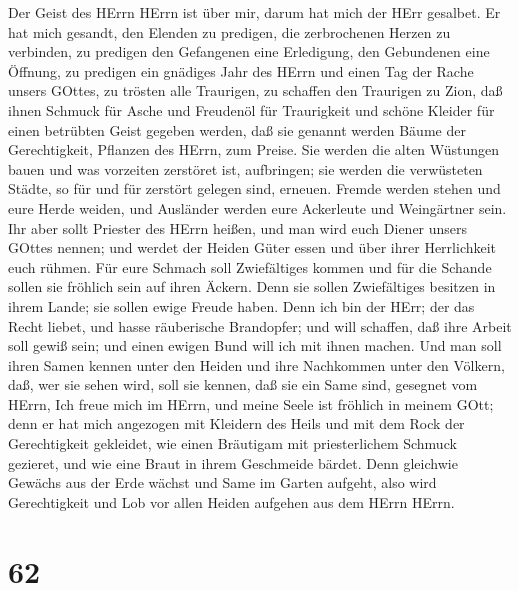  Der Geist des HErrn HErrn ist über mir, darum hat mich der
HErr gesalbet. Er hat mich gesandt, den Elenden zu predigen, die
zerbrochenen Herzen zu verbinden, zu predigen den Gefangenen eine
Erledigung, den Gebundenen eine Öffnung,  zu predigen ein
gnädiges Jahr des HErrn und einen Tag der Rache unsers GOttes, zu
trösten alle Traurigen,  zu schaffen den Traurigen zu Zion,
daß ihnen Schmuck für Asche und Freudenöl für Traurigkeit und schöne
Kleider für einen betrübten Geist gegeben werden, daß sie genannt werden
Bäume der Gerechtigkeit, Pflanzen des HErrn, zum Preise. 
Sie werden die alten Wüstungen bauen und was vorzeiten zerstöret ist,
aufbringen; sie werden die verwüsteten Städte, so für und für zerstört
gelegen sind, erneuen.  Fremde werden stehen und eure Herde
weiden, und Ausländer werden eure Ackerleute und Weingärtner sein.
 Ihr aber sollt Priester des HErrn heißen, und man wird euch
Diener unsers GOttes nennen; und werdet der Heiden Güter essen und über
ihrer Herrlichkeit euch rühmen.  Für eure Schmach soll
Zwiefältiges kommen und für die Schande sollen sie fröhlich sein auf
ihren Äckern. Denn sie sollen Zwiefältiges besitzen in ihrem Lande; sie
sollen ewige Freude haben.  Denn ich bin der HErr; der das
Recht liebet, und hasse räuberische Brandopfer; und will schaffen, daß
ihre Arbeit soll gewiß sein; und einen ewigen Bund will ich mit ihnen
machen.  Und man soll ihren Samen kennen unter den Heiden
und ihre Nachkommen unter den Völkern, daß, wer sie sehen wird, soll sie
kennen, daß sie ein Same sind, gesegnet vom HErrn,  Ich
freue mich im HErrn, und meine Seele ist fröhlich in meinem GOtt; denn
er hat mich angezogen mit Kleidern des Heils und mit dem Rock der
Gerechtigkeit gekleidet, wie einen Bräutigam mit priesterlichem Schmuck
gezieret, und wie eine Braut in ihrem Geschmeide bärdet. 
Denn gleichwie Gewächs aus der Erde wächst und Same im Garten aufgeht,
also wird Gerechtigkeit und Lob vor allen Heiden aufgehen aus dem HErrn
HErrn.

\hypertarget{section-61}{%
\section{62}\label{section-61}}

